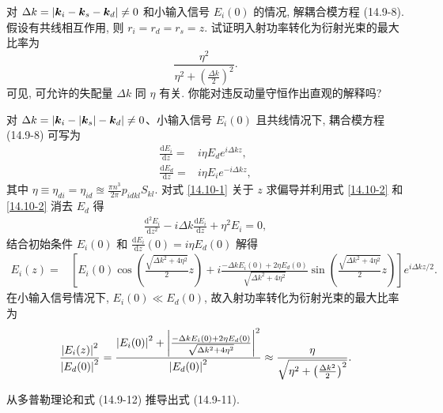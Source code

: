 \documentclass{note}
\begin{document}
\begin{exe}
    对 $\Delta k=\left\lvert\bm{k}_i-\bm{k}_s-\bm{k}_d\right\rvert\neq 0$ 和小输入信号 $E_i(0)$ 的情况, 解耦合模方程 (14.9-8). 假设有共线相互作用, 则 $r_i=r_d=r_s=z$. 试证明入射功率转化为衍射光束的最大比率为
    \[
        \frac{\eta^2}{\eta^2+\left(\frac{\Delta k}{2}\right)^2}.
    \]
    可见, 可允许的失配量 $\Delta k$ 同 $\eta$ 有关. 你能对违反动量守恒作出直观的解释吗?
\end{exe}
\begin{pf}
    对 $\Delta k=\left\lvert\bm{k}_i-\left\lvert\bm{k}_s\right\rvert-\bm{k}_d\right\rvert\neq 0$、小输入信号 $E_i(0)$ 且共线情况下, 耦合模方程 (14.9-8) 可写为
    \begin{align}
        \label{14.10-1}
        \frac{\mathrm{d}E_i}{\mathrm{d}z}=&i\eta E_de^{i\Delta kz},\\
        \label{14.10-2}
        \frac{\mathrm{d}E_d}{\mathrm{d}z}=&i\eta E_ie^{-i\Delta kz},
    \end{align}
    其中 $\eta\equiv\eta_{di}=\eta_{id}\approxeq\frac{\pi n^3}{2\pi}p_{idkl}S_{kl}$.
    对式 \eqref{14.10-1} 关于 $z$ 求偏导并利用式 \eqref{14.10-2} 和 \eqref{14.10-2} 消去 $E_d$ 得
    \begin{align}
        \frac{\mathrm{d}^2E_i}{\mathrm{d}z^2}-i\Delta k\frac{\mathrm{d}E_i}{\mathrm{d}z}+\eta^2E_i=0,
    \end{align}
    结合初始条件 $E_i(0)$ 和 $\frac{\mathrm{d}E_i}{\mathrm{d}z}(0)=i\eta E_d(0)$ 解得
    \begin{align}
        E_i(z)=&\left[E_i(0)\cos\left(\frac{\sqrt{\Delta k^2+4\eta^2}}{2}z\right)+i\frac{-\Delta kE_i(0)+2\eta E_d(0)}{\sqrt{\Delta k^2+4\eta^2}}\sin\left(\frac{\sqrt{\Delta k^2+4\eta^2}}{2}z\right)\right]e^{i\Delta kz/2}.
    \end{align}
    在小输入信号情况下, $E_i(0)\ll E_d(0)$, 故入射功率转化为衍射光束的最大比率为
    \begin{align}
        \frac{\left\lvert E_i(z)\right\rvert^2}{\left\lvert E_d(0)\right\rvert^2}=\frac{\left\lvert E_i(0)\right\rvert^2+\left\lvert\frac{-\Delta kE_i(0)+2\eta E_d(0)}{\sqrt{\Delta k^2+4\eta^2}}\right\rvert^2}{\left\lvert E_d(0)\right\rvert^2}\approx\frac{\eta}{\sqrt{\eta^2+\left(\frac{\Delta k^2}{2}\right)^2}}.
    \end{align}
\end{pf}%

\begin{exe}
    从多普勒理论和式 (14.9-12) 推导出式 (14.9-11).
\end{exe}
\begin{pf}
    
\end{pf}
\ifx\allfiles\undefined
\end{document}
